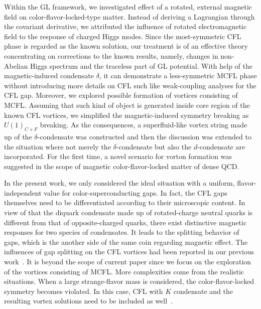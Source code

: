 \documentclass[prd, showpacs,nofootinbib,amsmath,amssymb]{revtex4}
\begin{document}
Within the GL framework, we investigated effect of a rotated, external magnetic field on
color-flavor-locked-type matter. Instead of 
deriving a Lagrangian through the covariant derivative, we attributed the influence of rotated electromagnetic field to the response of charged Higgs modes.
Since the most-symmetric CFL phase is regarded as the known solution, our treatment is of an effective theory
concentrating on corrections to the known results, namely, changes in non-Abelian Higgs spectrum and the
traceless part of GL potential. With help of the magnetic-induced condensate $\delta$, it can demonstrate a
less-symmetric MCFL phase without introducing more details on CFL such like weak-coupling analyses for the
CFL gap.
Moreover, we explored possible formation of vortices consisting of MCFL.
Assuming that such kind of object is generated inside core region of the known CFL vortices, we simplified
the magnetic-induced symmetry breaking as $U(1)_{C+F}$ breaking. As the consequences, a superfluid-like
vortex string made up of the $\delta$-condensate was constructed and then the discussion was extended to the situation where not merely the $\delta$-condensate but also the $d$-condensate are incorporated. For the first time, a novel scenario
for vorton formation was suggested in the scope of magnetic color-flavor-locked matter of dense QCD.

In the present work, we only considered the ideal situation with a uniform, flavor-independent value for
color-superconducting gaps. In fact, the CFL gaps themselves need to be differentiated according to their
microscopic content. In view of that the diquark condensate made up of rotated-charge neutral quarks is
different from that of opposite-charged quarks, there exist distinctive magnetic responses for two species
of condensates. It leads to the splitting behavior of gaps, which is the another side of the same coin
regarding magnetic effect. The influences of gap splitting on the CFL vortices had been reported in our
previous work~\cite{zhang2015magnetic}. It is beyond the scope of current
paper since we focus on the exploration of the vortices consisting of MCFL.
%
More complexities come from the realistic situations. When a large strange-flavor mass is considered,
the color-flavor-locked symmetry becomes violated. In this case, CFL with $K$ condensate and the
resulting vortex solutions need to be included as well~\cite{kaplan2002charged,buckley2002superconducting}.
\end{document}
